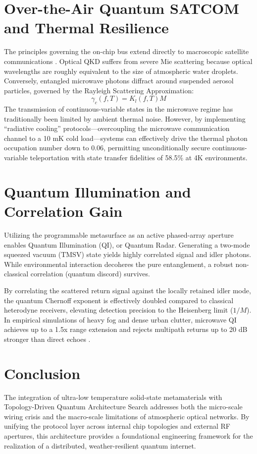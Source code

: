 \documentclass[11pt, a4paper]{article}
\begin{document}
\section{Over-the-Air Quantum SATCOM and Thermal Resilience}
The principles governing the on-chip bus extend directly to macroscopic satellite communications \cite{cryo_arch}. Optical QKD suffers from severe Mie scattering because optical wavelengths are roughly equivalent to the size of atmospheric water droplets. Conversely, entangled microwave photons diffract around suspended aerosol particles, governed by the Rayleigh Scattering Approximation:
\begin{equation}
\gamma_c(f,T) = K_l(f,T)M
\end{equation}
The transmission of continuous-variable states in the microwave regime has traditionally been limited by ambient thermal noise. However, by implementing ``radiative cooling'' protocols---overcoupling the microwave communication channel to a 10 mK cold load---systems can effectively drive the thermal photon occupation number down to 0.06, permitting unconditionally secure continuous-variable teleportation with state transfer fidelities of 58.5\% at 4K environments.

\section{Quantum Illumination and Correlation Gain}
Utilizing the programmable metasurface as an active phased-array aperture enables Quantum Illumination (QI), or Quantum Radar. Generating a two-mode squeezed vacuum (TMSV) state yields highly correlated signal and idler photons. While environmental interaction decoheres the pure entanglement, a robust non-classical correlation (quantum discord) survives.

By correlating the scattered return signal against the locally retained idler mode, the quantum Chernoff exponent is effectively doubled compared to classical heterodyne receivers, elevating detection precision to the Heisenberg limit ($1/M$). In empirical simulations of heavy fog and dense urban clutter, microwave QI achieves up to a 1.5x range extension and rejects multipath returns up to 20 dB stronger than direct echoes \cite{whitepaper_main}.

\section{Conclusion}
The integration of ultra-low temperature solid-state metamaterials with Topology-Driven Quantum Architecture Search addresses both the micro-scale wiring crisis and the macro-scale limitations of atmospheric optical networks. By unifying the protocol layer across internal chip topologies and external RF apertures, this architecture provides a foundational engineering framework for the realization of a distributed, weather-resilient quantum internet.
\end{document}

